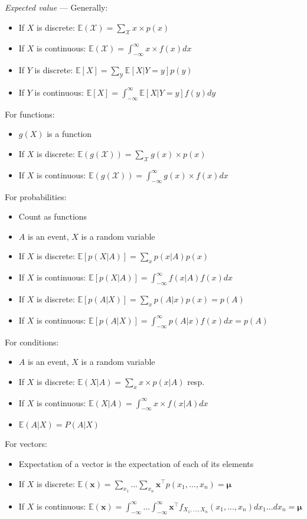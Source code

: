 \emph{Expected value} --- 
Generally:
\begin{itemize}
    \item If $X$ is discrete: $\mathbb{E}(\mathcal{X}) = \sum_{\mathcal{X}}x \times p(x)$
    \item If $X$ is continuous: $\mathbb{E}(\mathcal{X}) = \int_{-\infty}^{\infty}x \times f(x)dx$
    \item If $Y$ is discrete: $\mathbb{E}[X] = \sum_{\mathcal{Y}} \mathbb{E}[X | Y = y] p(y) $
    \item If $Y$ is continuous: $\mathbb{E}[X] = \int_{-\infty}^\infty \mathbb{E}[X | Y = y] f(y) dy$
\end{itemize}
For functions:
\begin{itemize}
    \item $g(X)$ is a function 
    \item If $X$ is discrete: $\mathbb{E}(g(\mathcal{X})) = \sum_{\mathcal{X}} g(x) \times p(x)$  
    \item If $X$ is continuous: $\mathbb{E}(g(\mathcal{X})) = \int_{-\infty}^{\infty} g(x) \times f(x)dx$ 
\end{itemize}
For probabilities:
\begin{itemize}
    \item Count as functions 
    \item $A$ is an event, $X$ is a random variable
    \item If $X$ is discrete: $\mathbb{E}[p(X | A)] = \sum_x p(x | A) p(x)$ 
    \item If $X$ is continuous: $\mathbb{E}[p(X | A)] = \int_{-\infty}^{\infty} f(x|A) f(x) dx$ 
    \item If $X$ is discrete: $\mathbb{E}[p(A | X)] = \sum_x p(A | x) p(x) = p(A) $ 
    \item If $X$ is continuous: $\mathbb{E}[p(A | X)] = \int_{-\infty}^{\infty} p(A|x) f(x) dx = p(A)$ 
\end{itemize}
For conditions:
\begin{itemize}
    \item $A$ is an event, $X$ is a random variable
    \item If $X$ is discrete: $\mathbb{E}(X | A) = \sum_x x \times p(x | A) $ resp. 
    \item If $X$ is continuous: $\mathbb{E}(X | A) = \int_{-\infty}^{\infty} x \times f(x|A)dx$
    \item $\mathbb{E}(A | X) = P(A|X)$
\end{itemize}
For vectors:
\begin{itemize}
    \item Expectation of a vector is the expectation of each of its elements
    \item If $X$ is discrete: $\mathbb{E}(\boldsymbol{x}) = \sum_{x_1} ... \sum_{x_n} \boldsymbol{x}^\intercal p(x_1,...,x_n) = \boldsymbol{\mu}$
    \item If $X$ is continuous: $\mathbb{E}(\boldsymbol{x}) = \int_{-\infty}^\infty ... \int_{-\infty}^\infty \boldsymbol{x}^\intercal f_{X_1, ..., X_n}(x_1, ..., x_n) d x_1 ... d x_n = \boldsymbol{\mu}$
\end{itemize}
